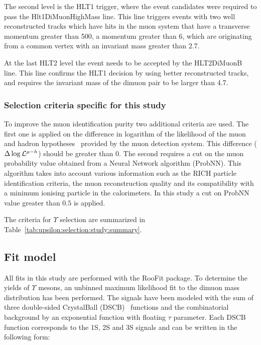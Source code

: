 The second level is the HLT1 trigger, where the event candidates were required to
pass the Hlt1DiMuonHighMass line.
This line triggers events with  two well reconstructed tracks  which have hits
in the muon system  that have a transverse momentum greater than 500\mevc,  
a momentum greater than 6\gevc, which are originating from a common vertex with
an invariant mass greater than 2.7\gevcc.

At the last HLT2 level the event needs to be accepted by the HLT2DiMuonB line.
This line confirms the HLT1 decision by using better reconstructed tracks, 
and requires the invariant mass of the dimuon pair to be larger than 4.7\gevcc.

\subsubsection{Selection criteria specific for this study}
\label{sec:upsilon:selection:study}

To improve the muon identification purity two additional criteria are used. The
first one is applied on the difference in logarithm of the likelihood of the
muon and hadron hypotheses~\cite{Powell} provided by the muon detection system.
This difference ($\Delta\log\mathcal{L}^{\mu-h}$) should be greater than 0. The
second requires a cut on the muon probability value obtained from a Neural
Network algorithm (ProbNN). This algorithm takes into account various
information such as the RICH particle identification criteria, the muon
reconstruction quality and its compatibility with a minimum ionising particle in the
calorimeters. In this study a cut on  ProbNN value
greater than $0.5$ is applied. 

The criteria for  $\Upsilon$ selection are summarized in
Table~\ref{tab:upsilon:selection:study:summary}.



\subsection{Fit model}
\label{sec:upsilon:fit}
All  fits in this study are performed with the RooFit package\cite{roofit}.
To determine the yields of $\Upsilon$ mesons, an unbinned maximum likelihood
fit to the dimuon mass distribution has been performed. The signals have been
modeled with the sum of three double-sided CrystalBall (DSCB)~\cite{Skwarnicki:1986xj} functions and the
combinatorial background by an exponential function with floating $\tau$
parameter. Each DSCB function corresponds to the \Y1S, \Y2S and \Y3S
signals and can be written in the following form:

